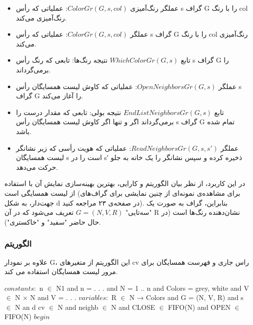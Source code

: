 \documentclass{book} %
\begin{document}
\begin{itemize}
    \item عملگر رنگ‌آمیزی‌ $ColorGr(G, s, col)$: عملیاتی که رأس s گراف G را با رنگ col رنگ‌آمیزی می‌کند.
   
    \item عملگر $ColorGr(G, s, col)$: عملیاتی که رأس s گراف G را با رنگ col رنگ‌آمیزی می‌کند.
    \item تابع $WhichColorGr(G, s)$ نتیجه رنگ‌ها: تابعی که رنگ رأس s گراف G را برمی‌گرداند.
    \item عملگر $OpenNeighborsGr(G, s)$: عملیاتی که کاوش لیست همسایگان رأس s گراف G را آغاز می‌کند.
    \item تابع $EndListNeighborsGr(G, s)$ نتیجه بولی: تابعی که مقدار درست را برمی‌گرداند اگر و تنها اگر کاوش لیست همسایگان رأس s گراف G تمام شده باشد.
    \item عملگر $ReadNeighborsGr(G, s, s′)$: عملیاتی که هویت رأسی که زیر نشانگر لیست همسایگان s است را در s′ ذخیره کرده و سپس نشانگر را یک خانه به جلو حرکت می‌دهد.
    
\end{itemize}

در این کاربرد، از نظر بیان الگوریتم و کارایی، بهترین بهینه‌سازی نمایش آن با استفاده از لیست همسایگی است (برای مشاهده‌ی نمونه‌ای از چنین نمایشی برای گراف‌های جهت‌دار، به شکل d در صفحه‌ی ۲۳ مراجعه کنید). بنابراین، گراف به صورت یک "سه‌تایی" $G = (N, V, R)$ تعریف می‌شود که در آن R نشان‌دهنده رنگ‌ها است (در حال حاضر "سفید" و "خاکستری").

\subsubsection*{الگوریتم}

علاوه بر نمودار G، این الگوریتم از متغیرهای cv راس جاری و فهرست همسایگان برای مرور لیست همسایگان استفاده می کند.


\begin{latin}
    
    \begin{algorithm}
        \begin{algorithmic}
            \STATE $constants:$
            \STATE n $\in$ N1 and n = . . . and N = 1 .. n and Colors = {grey, white} and
            \STATE V $\in$ N × N and V = {. . .}
            \STATE $variables:$
            \STATE R $\in$ N → Colors and G = (N, V, R) and
            \STATE s $\in$ N an d cv $\in$ N and neighb $\in$ N and CLOSE $\in$ FIFO(N) and OPEN $\in$ FIFO(N)
            \STATE $begin$
        \end{algorithmic}
    \end{algorithm}
        
\end{latin}
\end{document}
